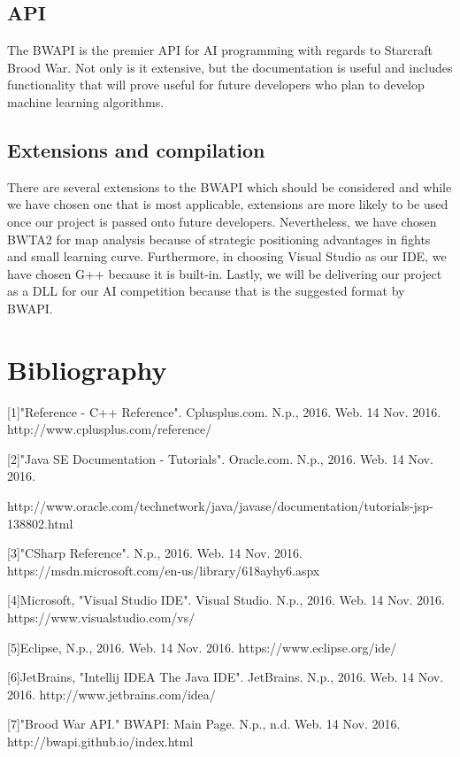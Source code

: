 \subsection{API}
The BWAPI is the premier API for AI programming with regards to Starcraft Brood War. Not only is it extensive, but the documentation is useful and includes functionality that will prove useful for future developers who plan to develop machine learning algorithms.

\subsection{Extensions and compilation}
There are several extensions to the BWAPI which should be considered and while we have chosen one that is most applicable, extensions are more likely to be used once our project is passed onto future developers. Nevertheless, we have chosen BWTA2 for map analysis because of strategic positioning advantages in fights and small learning curve. Furthermore, in choosing Visual Studio as our IDE, we have chosen G++ because it is built-in. Lastly, we will be delivering our project as a DLL for our AI competition because that is the suggested format by BWAPI.


\newpage

\section{Bibliography}
[1]"Reference - C++ Reference". Cplusplus.com. N.p., 2016. Web. 14 Nov. 2016. http://www.cplusplus.com/reference/

[2]"Java SE Documentation - Tutorials". Oracle.com. N.p., 2016. Web. 14 Nov. 2016.

http://www.oracle.com/technetwork/java/javase/documentation/tutorials-jsp-138802.html

[3]"CSharp Reference". N.p., 2016. Web. 14 Nov. 2016. https://msdn.microsoft.com/en-us/library/618ayhy6.aspx

[4]Microsoft, "Visual Studio IDE". Visual Studio. N.p., 2016. Web. 14 Nov. 2016. https://www.visualstudio.com/vs/

[5]Eclipse, N.p., 2016. Web. 14 Nov. 2016. https://www.eclipse.org/ide/

[6]JetBrains, "Intellij IDEA The Java IDE". JetBrains. N.p., 2016. Web. 14 Nov. 2016. http://www.jetbrains.com/idea/

[7]"Brood War API." BWAPI: Main Page. N.p., n.d. Web. 14 Nov. 2016. http://bwapi.github.io/index.html

